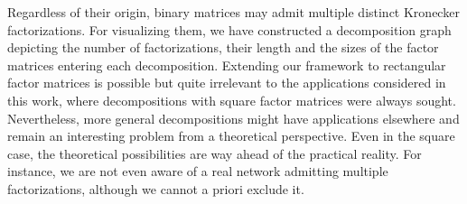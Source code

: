 \documentclass{article}
\numberwithin{equation}{section}
\theoremstyle{definition}
\begin{document}
Regardless of their origin, binary matrices may admit multiple distinct Kronecker factorizations. For visualizing them, we have constructed a decomposition graph depicting the number of factorizations, their length and the sizes of the factor matrices entering each decomposition. Extending our framework to rectangular factor matrices is possible but quite irrelevant to the applications considered in this work, where decompositions with square factor matrices were always sought. Nevertheless, more general decompositions might have applications elsewhere and remain an interesting problem from a theoretical perspective. Even in the square case, the theoretical possibilities are way ahead of the practical reality. For instance, we are not even aware of a real network admitting multiple factorizations, although we cannot a priori exclude it.
\end{document}
